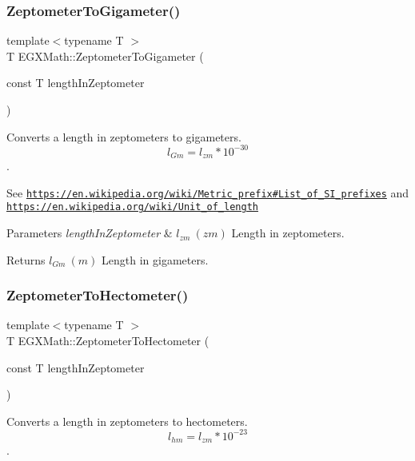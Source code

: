 \subsubsection{\texorpdfstring{Zeptometer\+To\+Gigameter()}{ZeptometerToGigameter()}}
{\footnotesize\ttfamily template$<$typename T $>$ \\
T E\+G\+X\+Math\+::\+Zeptometer\+To\+Gigameter (\begin{DoxyParamCaption}\item[{const T}]{length\+In\+Zeptometer }\end{DoxyParamCaption})}



Converts a length in zeptometers to gigameters. \[ l_{Gm}=l_{zm} * 10^{-30} \]. 

See \href{https://en.wikipedia.org/wiki/Metric_prefix#List_of_SI_prefixes}{\tt https\+://en.\+wikipedia.\+org/wiki/\+Metric\+\_\+prefix\#\+List\+\_\+of\+\_\+\+S\+I\+\_\+prefixes} and \href{https://en.wikipedia.org/wiki/Unit_of_length}{\tt https\+://en.\+wikipedia.\+org/wiki/\+Unit\+\_\+of\+\_\+length} 
\begin{DoxyParams}{Parameters}
{\em length\+In\+Zeptometer} & $ l_{zm}\ (zm)$ Length in zeptometers. \\
\hline
\end{DoxyParams}
\begin{DoxyReturn}{Returns}
$ l_{Gm}\ (m)$ Length in gigameters. 
\end{DoxyReturn}
\mbox{\label{group___e_g_x_math-_conversions-_length_conversions-_zeptometer-_s_i_ga4f9724a5c86f9e85aee3bad4d04a7faa}} 
\subsubsection{\texorpdfstring{Zeptometer\+To\+Hectometer()}{ZeptometerToHectometer()}}
{\footnotesize\ttfamily template$<$typename T $>$ \\
T E\+G\+X\+Math\+::\+Zeptometer\+To\+Hectometer (\begin{DoxyParamCaption}\item[{const T}]{length\+In\+Zeptometer }\end{DoxyParamCaption})}



Converts a length in zeptometers to hectometers. \[ l_{hm}=l_{zm} * 10^{-23} \]. 

